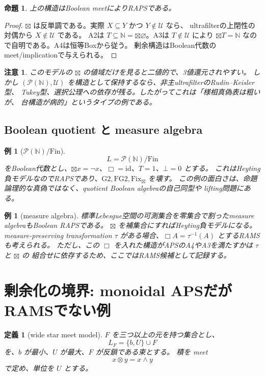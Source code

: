 \documentclass[uplatex,dvipdfmx,a4paper,10pt]{jsarticle}
\newtheorem{proposition}[theorem]{命題}
\newtheorem{definition}[theorem]{定義}
\newtheorem{example}[theorem]{例}
\newtheorem{remark}[theorem]{注意}
\newcommand{\Gtwo}{\mathrm{G2}}
\newcommand{\FGtwo}{\mathrm{FG2}}
\newcommand{\Fix}{\mathrm{Fix}}
\newcommand{\bt}{\boxtimes}
\newcommand{\Pow}{\mathcal P}
\newcommand{\calU}{\mathcal U}
\newcommand{\N}{\mathbb N}
\begin{document}
\begin{proposition}
上の構造はBoolean meetによりRAPSである。
\end{proposition}

\begin{proof}
\(\bt\) は反単調である。実際 \(X\subseteq Y\) かつ \(Y\notin\calU\) なら、
ultrafilterの上閉性の対偶から \(X\notin\calU\) である。
A2は \(T\subseteq\N=\bt\varnothing\)。A3は \(T\notin\calU\) により
\(\bt T=\N\) なので自明である。A4は恒等Boxから従う。
剰余構造はBoolean代数のmeet/implicationで与えられる。
\end{proof}

\begin{remark}
このモデルの \(\bt\) の値域だけを見ると二値的で、3値還元されやすい。
しかし \((\Pow(\N),\calU)\) を構造として保持するなら、非主ultrafilterのRudin--Keisler型、
Tukey型、選択公理への依存が残る。したがってこれは「様相真偽表は粗いが、
台構造が病的」というタイプの例である。
\end{remark}

\subsection{Boolean quotient と measure algebra}

\begin{example}[\(\Pow(\N)/\mathrm{Fin}\)]
\[
L=\Pow(\N)/\mathrm{Fin}
\]
をBoolean代数とし、\(\bt x=\neg x\)、\(\Box=\mathrm{id}\)、\(T=1\)、\(\bot=0\) とする。
これはHeyting負モデルなのでRAPSであり、\(\Gtwo,\FGtwo,\Fix_{\bt}\) を壊す。
この例の面白さは、命題論理的な真偽ではなく、quotient Boolean algebraの自己同型や
lifting問題にある。
\end{example}

\begin{example}[measure algebra]
標準Lebesgue空間の可測集合を零集合で割ったmeasure algebraもBoolean RAPSである。
\(\bt\) を補集合にすればHeyting負モデルになる。measure-preserving transformation
\(\tau\) がある場合、\(\Box A=\tau^{-1}(A)\) とするRAMSも考えられる。
ただし、この \(\Box\) を入れた構造がAPSのA4やA3を満たすかは \(\tau\) と \(\bt\) の
組合せに依存するため、ここではRAMS候補として記録する。
\end{example}

\section{剰余化の境界: monoidal APSだがRAMSでない例}

\begin{definition}[wide star meet model]
\(F\) を三つ以上の元を持つ集合とし、
\[
L_F=\{b,U\}\cup F
\]
を、\(b\) が最小、\(U\) が最大、\(F\) が反鎖である束とする。
積を meet
\[
x\otimes y=x\wedge y
\]
で定め、単位を \(U\) とする。
\end{definition}
\end{document}
